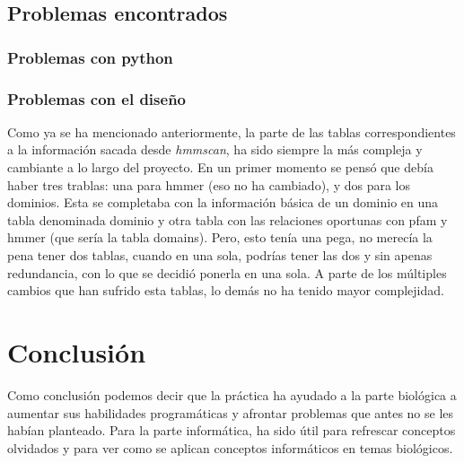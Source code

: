 \documentclass[11pt]{article} %
\begin{document}
\subsection{Problemas encontrados}

\subsubsection{Problemas con python}

\subsubsection{Problemas con el dise\~no}

Como ya se ha mencionado anteriormente, la parte de las tablas correspondientes a la informaci\'on sacada desde \emph{hmmscan}, ha sido siempre la m\'as compleja y cambiante a lo largo del proyecto. En un primer momento se pens\'o que deb\'ia haber tres trablas: una para hmmer (eso no ha cambiado), y dos para los dominios. Esta se completaba con la informaci\'on b\'asica de un dominio en una tabla denominada dominio y otra tabla con las relaciones oportunas con pfam y hmmer (que ser\'ia la tabla domains). Pero, esto ten\'ia una pega, no merec\'ia la pena tener dos tablas, cuando en una sola, podr\'ias tener las dos y sin apenas redundancia, con lo que se decidi\'o ponerla en una sola.
A parte de los m\'ultiples cambios que han sufrido esta tablas, lo dem\'as no ha tenido mayor complejidad. 

\section{Conclusi\'on}

Como conclusi\'on podemos decir que la pr\'actica ha ayudado a la parte biol\'ogica a aumentar sus habilidades program\'aticas y afrontar problemas que antes no se les hab\'ian planteado. Para la parte inform\'atica, ha sido \'util para refrescar conceptos olvidados y para ver como se aplican conceptos inform\'aticos en temas biol\'ogicos.
\end{document}
